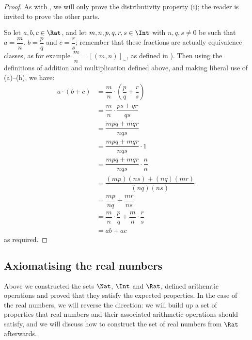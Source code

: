 \begin{proof}
As with , we will only prove the distributivity property (i); the reader is invited to prove the other parts.

So let $a,b,c \in \Rat$, and let $m,n,p,q,r,s \in \Int$ with $n,q,s \ne 0$ be such that $a=\dfrac{m}{n}$. $b=\dfrac{p}{q}$ and $c=\dfrac{r}{s}$; remember that these fractions are actually equivalence classes, as for example $\dfrac{m}{n} = [(m,n)]_{\sim}$, as defined in ). Then using the definitions of addition and multiplication defined above, and making liberal use of (a)--(h), we have:
\begin{align*}
a \cdot (b+c)
&= \dfrac{m}{n} \cdot \left( \dfrac{p}{q} + \dfrac{r}{s} \right) \\
&= \dfrac{m}{n} \cdot \dfrac{ps+qr}{qs} \\
&= \dfrac{mpq+mqr}{nqs} \\
&= \dfrac{mpq+mqr}{nqs} \cdot 1 \\
&= \dfrac{mpq+mqr}{nqs} \cdot \dfrac{n}{n} \\
&= \dfrac{(mp)(ns)+(nq)(mr)}{(nq)(ns)} \\
&= \dfrac{mp}{nq} + \dfrac{mr}{ns} \\
&= \dfrac{m}{n} \cdot \dfrac{p}{q} + \dfrac{m}{n} \cdot \dfrac{r}{s} \\
&= ab + ac
\end{align*}
as required.
\end{proof}

\subsection*{Axiomatising the real numbers}

Above we constructed the sets $\Nat$, $\Int$ and $\Rat$, defined arithemtic operations and proved that they satisfy the expected properties. In the case of the real numbers, we will reverse the direction: we will build up a set of properties that real numbers and their associated arithmetic operations should satisfy, and we will discuss how to construct the set of real numbers from $\Rat$ afterwards.

